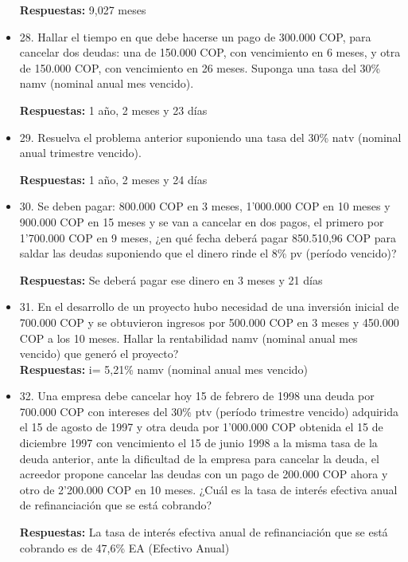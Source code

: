 \begin{itemize}
       \textbf{ Respuestas:} 9,027 meses
       \medskip

 \item 28. Hallar el tiempo en que debe hacerse un pago de 300.000 COP, para cancelar dos deudas: una de 150.000 COP, con vencimiento en 6 meses, y otra de 150.000 COP, con vencimiento en 26 meses. Suponga una tasa del 30\% namv (nominal anual mes vencido).
 
       \textbf{Respuestas:} 1 año, 2 meses y 23 días
       \medskip

 \item 29. Resuelva el problema anterior suponiendo una tasa del 30\% natv (nominal anual trimestre vencido).
 
       \textbf{Respuestas:} 1 año, 2 meses y 24 días
       \medskip

 \item 30. Se deben pagar: 800.000 COP en 3 meses, 1’000.000 COP en 10 meses y 900.000 COP en 15 meses y se van a cancelar en dos pagos, el primero por 1’700.000 COP en 9 meses,  ¿en qué fecha deberá pagar 850.510,96 COP para saldar las deudas suponiendo que el dinero rinde el 8\% pv (período vencido)?
 
 \textbf{Respuestas:} Se deberá pagar ese dinero en 3 meses y 21 días
       \medskip

 \item 31. En el desarrollo de un proyecto hubo necesidad de una inversión inicial de 700.000 COP y se obtuvieron ingresos por 500.000 COP en 3 meses y 450.000 COP a los 10 meses. Hallar la rentabilidad namv (nominal anual mes vencido) que generó el proyecto?\\
  \textbf{Respuestas:} i= 5,21\% namv (nominal anual mes vencido)
       \medskip

 \item 32. Una empresa debe cancelar hoy 15 de febrero de 1998 una deuda por 700.000 COP con intereses del 30\% ptv (período trimestre vencido) adquirida el 15 de agosto de 1997 y otra deuda por 1’000.000 COP obtenida el 15 de diciembre 1997 con vencimiento el 15 de junio 1998 a la misma tasa de la deuda anterior, ante la dificultad de la empresa para cancelar la deuda, el acreedor propone cancelar las deudas con un pago de 200.000 COP ahora y otro de 2’200.000 COP en 10 meses. ¿Cuál es la tasa de interés efectiva anual de refinanciación que se está cobrando?
 
 \textbf{Respuestas:} La tasa de interés efectiva anual de refinanciación que se está cobrando es de 47,6\% EA (Efectivo Anual) 
       \medskip


\end{itemize}
